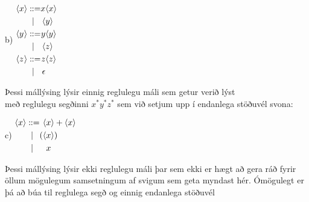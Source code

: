 \documentclass[leqno]{article}
\begin{document}
\begin{itemize}
\begin{minipage}{.20\linewidth}
			\item[b)] $\begin{alignedat}{3}
\langle & x & \rangle :& \hspace{-.3em}:= & x & \langle x \rangle \\
		&   &          &  |               & \langle & y \rangle \\
\langle & y & \rangle :& \hspace{-.3em}:= & y & \langle y \rangle \\
		&   &          &  |               & \langle & z \rangle \\
\langle & z & \rangle :& \hspace{-.3em}:= & z & \langle z \rangle \\
		&   &          &  |               & \epsilon & \\
    \end{alignedat}$
\end{minipage}
\begin{minipage}{.80\linewidth}
	Þessi mállýsing lýsir einnig reglulegu máli sem getur verið lýst \\
	með reglulegu segðinni $x^*y^*z^*$ sem við setjum upp í endanlega
	 stöðuvél svona:
	 \\
\begin{center}
\end{center}
\end{minipage}

\vspace{3em}

\begin{minipage}{.20\linewidth}
			\item[c)] $\begin{alignedat}{3}
\langle & x & \rangle :& \hspace{-.3em}:= & \langle & x \rangle + \langle x \rangle \\
		&   &          &  |               & (\langle & x \rangle) \\
		&   &          &  |               & & x \\
    \end{alignedat}$
\end{minipage}
\begin{minipage}{.80\linewidth}
	Þessi mállýsing lýsir ekki reglulegu máli þar sem ekki er hægt að 
	gera ráð fyrir öllum mögulegum samsetningum af svigum sem geta myndast
	 hér. Ómögulegt er þá að búa til reglulega segð og einnig endanlega 
	 stöðuvél
 \end{minipage}


\end{itemize}
\end{document}
